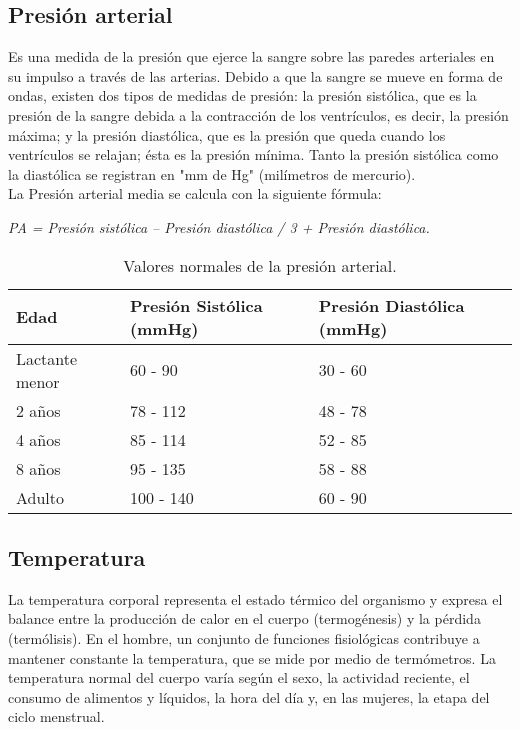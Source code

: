 	\subsection{Presión arterial}
	Es una medida de la presión que ejerce la sangre sobre las paredes arteriales en su impulso a través de las arterias. Debido a que la sangre se mueve en forma de ondas, existen dos tipos de medidas de presión: la presión sistólica, que es la presión de la sangre debida a la contracción de los ventrículos, es decir, la presión máxima; y la presión diastólica, que es la presión que queda cuando los ventrículos se relajan; ésta es la presión mínima. Tanto la presión sistólica como la diastólica se registran en "mm de Hg" (milímetros de mercurio). \cite{valoresUNAM} \cite{aguayoChile} \cite{signosvitales2016} \\
	
	La Presión arterial media se calcula con la siguiente fórmula: 
	
	\begin{center}
		\textit{PA = Presión sistólica – Presión diastólica / 3 + Presión diastólica.}
	\end{center}
	
	\begin{table}[htbp]
		\begin{center}
			\begin{tabular}{|l|l|l|}
				\hline
				\textbf{Edad} & \textbf{Presión Sistólica (mmHg)} & \textbf{Presión Diastólica (mmHg)} \\
				\hline \hline
				Lactante menor & 60 - 90 & 30 - 60 \\
				\hline
				2 años  & 78 - 112 & 48 - 78 \\
				\hline
				4 años & 85 - 114 & 52 - 85 \\
				\hline
				8 años & 95 - 135 & 58 - 88 \\
				\hline
				Adulto & 100 - 140 & 60 - 90 \\
				\hline
			\end{tabular}
			\caption{Valores normales de la presión arterial.}
		\end{center}
	\end{table}
	
	\subsection{Temperatura}
	La temperatura corporal representa el estado térmico del organismo y expresa el balance entre la producción de calor en el cuerpo (termogénesis) y la pérdida (termólisis). En el hombre, un conjunto de funciones fisiológicas contribuye a mantener constante la temperatura, que se mide por medio de termómetros. La temperatura normal del cuerpo varía según el sexo, la actividad reciente, el consumo de alimentos y líquidos, la hora del día y, en las mujeres, la etapa del ciclo menstrual. \cite{cobo2011} \cite{signosvitales2016} \cite{}
	
